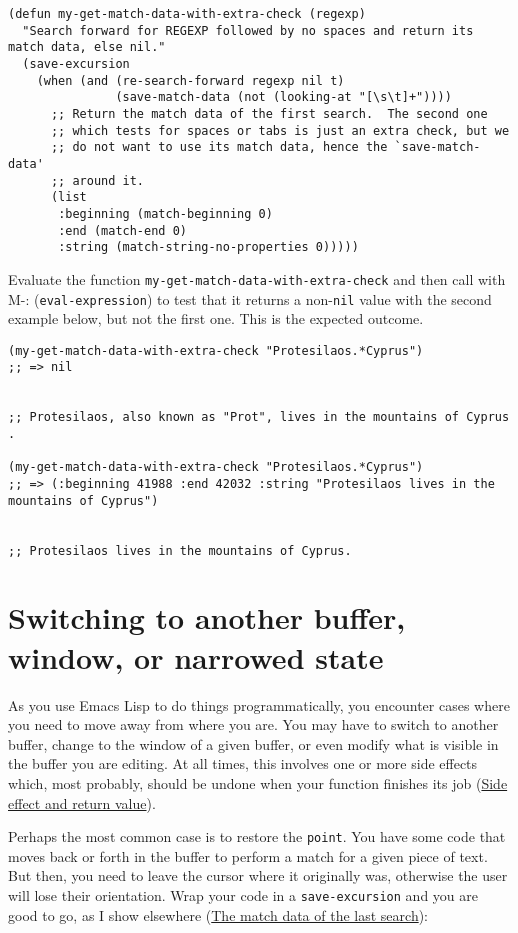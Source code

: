 \documentclass[11pt]{ctexart}
\begin{document}
\begin{verbatim}
(defun my-get-match-data-with-extra-check (regexp)
  "Search forward for REGEXP followed by no spaces and return its match data, else nil."
  (save-excursion
    (when (and (re-search-forward regexp nil t)
               (save-match-data (not (looking-at "[\s\t]+"))))
      ;; Return the match data of the first search.  The second one
      ;; which tests for spaces or tabs is just an extra check, but we
      ;; do not want to use its match data, hence the `save-match-data'
      ;; around it.
      (list
       :beginning (match-beginning 0)
       :end (match-end 0)
       :string (match-string-no-properties 0)))))
\end{verbatim}

Evaluate the function \texttt{my-get-match-data-with-extra-check} and then call with M-: (\texttt{eval-expression}) to test that it returns a non-\texttt{nil} value with the second example below, but not the first one. This is the expected outcome.

\begin{verbatim}
(my-get-match-data-with-extra-check "Protesilaos.*Cyprus")
;; => nil


;; Protesilaos, also known as "Prot", lives in the mountains of Cyprus   .

(my-get-match-data-with-extra-check "Protesilaos.*Cyprus")
;; => (:beginning 41988 :end 42032 :string "Protesilaos lives in the mountains of Cyprus")


;; Protesilaos lives in the mountains of Cyprus.
\end{verbatim}
\section{Switching to another buffer, window, or narrowed state}
\label{sec:org518036f}
As you use Emacs Lisp to do things programmatically, you encounter cases where you need to move away from where you are. You may have to switch to another buffer, change to the window of a given buffer, or even modify what is visible in the buffer you are editing. At all times, this involves one or more side effects which, most probably, should be undone when your function finishes its job (\hyperref[sec:org2689823]{Side effect and return value}).

Perhaps the most common case is to restore the \texttt{point}. You have some code that moves back or forth in the buffer to perform a match for a given piece of text. But then, you need to leave the cursor where it originally was, otherwise the user will lose their orientation. Wrap your code in a \texttt{save-excursion} and you are good to go, as I show elsewhere (\hyperref[sec:orge641c75]{The match data of the last search}):
\end{document}
